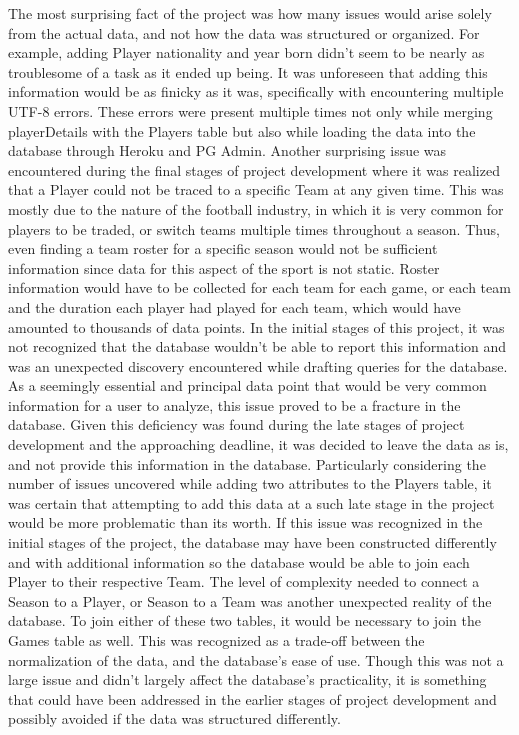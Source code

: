 The most surprising fact of the project was how many issues would arise solely from the actual data, and not how the data was structured or organized. For example, adding Player nationality and year born didn't seem to be nearly as troublesome of a task as it ended up being. It was unforeseen that adding this information would be as finicky as it was, specifically with encountering multiple UTF-8 errors. These errors were present multiple times not only while merging playerDetails with the Players table but also while loading the data into the database through Heroku and PG Admin. Another surprising issue was encountered during the final stages of project development where it was realized that a Player could not be traced to a specific Team at any given time. This was mostly due to the nature of the football industry, in which it is very common for players to be traded, or switch teams multiple times throughout a season. Thus, even finding a team roster for a specific season would not be sufficient information since data for this aspect of the sport is not static. Roster information would have to be collected for each team for each game, or each team and the duration each player had played for each team, which would have amounted to thousands of data points. In the initial stages of this project, it was not recognized that the database wouldn't be able to report this information and was an unexpected discovery encountered while drafting queries for the database. As a seemingly essential and principal data point that would be very common information for a user to analyze, this issue proved to be a fracture in the database. Given this deficiency was found during the late stages of project development and the approaching deadline, it was decided to leave the data as is, and not provide this information in the database. Particularly considering the number of issues uncovered while adding two attributes to the Players table, it was certain that attempting to add this data at a such late stage in the project would be more problematic than its worth. If this issue was recognized in the initial stages of the project, the database may have been constructed differently and with additional information so the database would be able to join each Player to their respective Team. The level of complexity needed to connect a Season to a Player, or Season to a Team was another unexpected reality of the database. To join either of these two tables, it would be necessary to join the Games table as well. This was recognized as a trade-off between the normalization of the data, and the database's ease of use. Though this was not a large issue and didn't largely affect the database's practicality, it is something that could have been addressed in the earlier stages of project development and possibly avoided if the data was structured differently.
